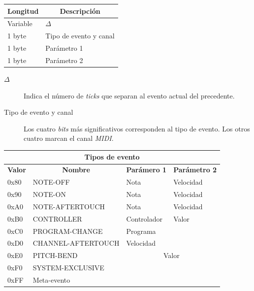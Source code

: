\begin{center}
	\begin{tabular}{|l|l|}
		\hline \multicolumn{1}{|c|}{\textbf{Longitud}} & \multicolumn{1}{c|}{\textbf{Descripción}} \\
		\hline Variable & $\Delta$ \\ 
		\hline 1 byte & Tipo de evento y canal \\ 
		\hline 1 byte & Parámetro 1 \\ 
		\hline 1 byte & Parámetro 2 \\ 
		\hline 
	\end{tabular} 
\end{center}

\begin{description}
	\item[$\Delta$] Indica el número de \textit{ticks} que separan al evento actual del precedente.
	\item[Tipo de evento y canal] Los cuatro \textit{bits} más significativos corresponden al tipo de evento. Los otros cuatro marcan el canal \textit{MIDI}.
\end{description}

\begin{center}
	\begin{tabular}{|l|l|l|l|}
		\hline \multicolumn{4}{|c|}{\textbf{Tipos de evento}} \\
		\hline \multicolumn{1}{|c|}{\textbf{Valor}} & \multicolumn{1}{c|}{\textbf{Nombre}} & \multicolumn{1}{c|}{\textbf{Parámero 1}} & \multicolumn{1}{c|}{\textbf{Parámetro 2}} \\
		\hline 0x80 & NOTE-OFF & Nota & Velocidad \\
		\hline 0x90 & NOTE-ON & Nota & Velocidad \\
		\hline 0xA0 & NOTE-AFTERTOUCH & Nota & Velocidad \\
		\hline 0xB0 & CONTROLLER & Controlador & Valor \\
		\hline 0xC0 & PROGRAM-CHANGE & Programa &  \\
		\hline 0xD0 & CHANNEL-AFTERTOUCH & Velocidad &  \\
		\hline 0xE0 & PITCH-BEND & \multicolumn{2}{c|}{Valor} \\
		\hline 0xF0 & SYSTEM-EXCLUSIVE & \multicolumn{2}{c|}{} \\
		\hline 0xFF & Meta-evento & \multicolumn{2}{c|}{} \\
		\hline 
	\end{tabular} 
\end{center}

